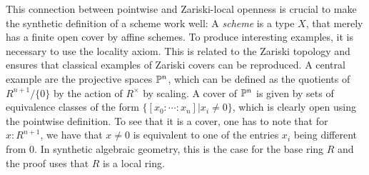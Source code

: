 This connection between pointwise and Zariski-local openness is crucial to make the synthetic definition of a scheme work well:
A \emph{scheme} is a type $X$, that merely has a finite open cover by affine schemes.
To produce interesting examples, it is necessary to use the locality axiom.
This is related to the Zariski topology and ensures that classical examples of Zariski covers can be reproduced.
A central example are the projective spaces $\mathbb{P}^n$, which can be defined as the quotients of $R^{n+1}/\{0\}$ by the action of $R^\times$ by scaling.
A cover of $\mathbb{P}^n$ is given by sets of equivalence classes of the form $\{[x_0:\cdots:x_n] \vert x_i\neq 0 \}$, which is clearly open using the pointwise definition.
To see that it is a cover, one has to note that for $x:R^{n+1}$, we have that $x\neq 0$ is equivalent to one of the entries $x_i$ being different from $0$. In synthetic algebraic geometry, this is the case for the base ring $R$ and the proof uses that $R$ is a local ring.
